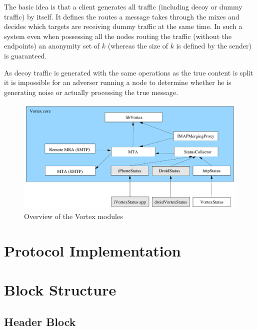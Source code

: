 The basic idea is that a client generates all traffic (including decoy or dummy traffic) by itself. It defines the routes a message takes through the mixes and decides which targets are receiving dummy traffic at the same time. In such a system even when possessing all the nodes routing the traffic (without the endpoints) an anonymity set of $k$ (whereas the size of $k$ is defined by the sender) is guaranteed.

As decoy traffic is generated with the same operations as the true content is split it is impossible for an adverser running a node to determine whether he is generating noise or actually processing the true message.

\begin{figure}[h]
	\includegraphics[width=\textwidth]{inc/VortexModules.pdf}
	\caption{Overview of the Vortex modules}
	\label{fig:vortexModules}
\end{figure}

\section{Protocol Implementation\label{protoImpl}}

\section{Block Structure}
 

\subsection{Header Block}

